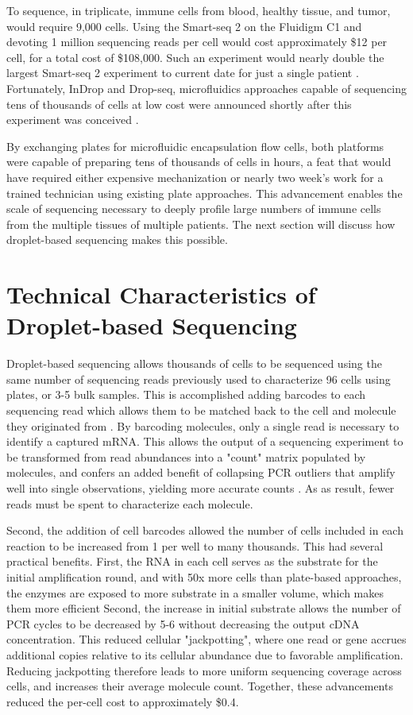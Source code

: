 To sequence, in triplicate, immune cells from blood, healthy tissue, and tumor, would require 9,000 cells. 
Using the Smart-seq 2 on the Fluidigm C1 and devoting 1 million sequencing reads per cell would cost approximately \$12 per cell, for a total cost of \$108,000.
Such an experiment would nearly double the largest Smart-seq 2 experiment to current date for just a single patient \citep{Zheng2017}. 
Fortunately, InDrop and Drop-seq, microfluidics approaches capable of sequencing tens of thousands of cells at low cost were announced shortly after this experiment was conceived \citep{Klein2015,Macosko2015}. 

By exchanging plates for microfluidic encapsulation flow cells, both platforms were capable of preparing tens of thousands of cells in hours, a feat that would have required either expensive mechanization or nearly two week’s work for a trained technician using existing plate approaches.
This advancement enables the scale of sequencing necessary to deeply profile large numbers of immune cells from the multiple tissues of multiple patients. 
The next section will discuss how droplet-based sequencing makes this possible.

\section{Technical Characteristics of Droplet-based Sequencing} \label{technical-problems}

Droplet-based sequencing allows thousands of cells to be sequenced using the same number of sequencing reads previously used to characterize 96 cells using plates, or 3-5 bulk samples. 
This is accomplished adding barcodes to each sequencing read which allows them to be matched back to the cell and molecule they originated from \citep{Klein2015,Macosko2015}. 
By barcoding molecules, only a single read is necessary to identify a captured mRNA\@.
This allows the output of a sequencing experiment to be transformed from read abundances into a "count" matrix populated by molecules, and confers an added benefit of collapsing PCR outliers that amplify well into single observations, yielding more accurate counts \citep{Grun2016}. 
As as result, fewer reads must be spent to characterize each molecule.

Second, the addition of cell barcodes allowed the number of cells included in each reaction to be increased from 1 per well to many thousands. 
This had several practical benefits. 
First, the RNA in each cell serves as the substrate for the initial amplification round, and with 50x more cells than plate-based approaches, the enzymes are exposed to more substrate in a smaller volume, which makes them more efficient
Second, the increase in initial substrate allows the number of PCR cycles to be decreased by 5-6 without decreasing the output cDNA concentration.
This reduced cellular "jackpotting", where one read or gene accrues additional copies relative to its cellular abundance due to favorable amplification. 
Reducing jackpotting therefore leads to more uniform sequencing coverage across cells, and increases their average molecule count. 
Together, these advancements reduced the per-cell cost to approximately \$0.4. 

